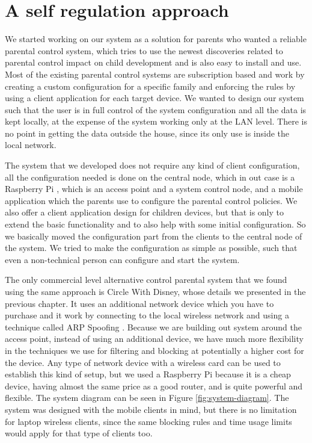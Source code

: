 
\chapter{A self regulation approach} %

\label{Chapter3} %

We started working on our system as a solution for parents who wanted a reliable parental control system, which tries to use the newest discoveries related to parental control impact on child development and is also easy to install and use. Most of the existing parental control systems are subscription based and work by creating a custom configuration for a specific family and enforcing the rules by using a client application for each target device. We wanted to design our system such that the user is in full control of the system configuration and all the data is kept locally, at the expense of the system working only at the LAN level. There is no point in getting the data outside the house, since its only use is inside the local network. 

The system that we developed does not require any kind of client configuration, all the configuration needed is done on the central node, which in out case is a Raspberry Pi \citep{raspberryPi}, which is an access point and a system control node, and a mobile application which the parents use to configure the parental control policies. We also offer a client application design for children devices, but that is only to extend the basic functionality and to also help with some initial configuration. So we basically moved the configuration part from the clients to the central node of the system. We tried to make the configuration as simple as possible, such that even a non-technical person can configure and start the system. 

The only commercial level alternative control parental system that we found using the same approach is Circle With Disney, whose details we presented in the previous chapter. It uses an additional network device which you have to purchase and it work by connecting to the local wireless network and using a technique called ARP Spoofing \citep{lockhart2004network}. Because we are building out system around the access point, instead of using an additional device, we have much more flexibility in the techniques we use for filtering and blocking at potentially a higher cost for the device. Any type of network device with a wireless card can be used to establish this kind of setup, but we used a Raspberry Pi because it is a cheap device, having almost the same price as a good router, and is quite powerful and flexible. The system diagram can be seen in Figure \ref{fig:system-diagram}. The system was designed with the mobile clients in mind, but there is no limitation for laptop wireless clients, since the same blocking rules and time usage limits would apply for that type of clients too.

